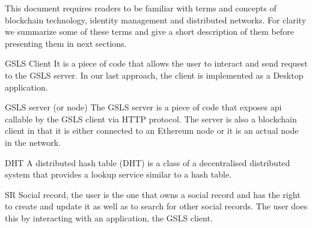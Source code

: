 \documentclass[12pt,twoside]{article}
\begin{document}
This document requires readers to be familiar with terms and concepts of blockchain technology, identity management and distributed networks. For clarity we summarize some of these terms and give a short description of them before presenting them in next sections.

\begin{basedescript}{\desclabelstyle{\pushlabel}\desclabelwidth{10em}}
\item[GSLS Client]              It is a piece of code that allows the user to interact and send request to the GSLS server. In our last approach, the client is implemented as a Desktop application.
\item[GSLS server (or node)]    The GSLS server is a piece of code that exposes api callable by the GSLS client via HTTP protocol. The server is also a blockchain client in that it is either connected to an Ethereum node or it is an actual node in the network.
\item[DHT]                      A distributed hash table (DHT) is a class of a decentralised distributed system that provides a lookup service similar to a hash table.
\item[SR]                       Social record, the user is the one that owns a social record and has the right to create and update it as well as to search for other social records. The user does this by interacting with an application, the GSLS client.
\end{basedescript}


\clearpage








\appendix

\end{document}

